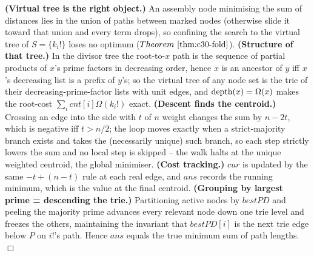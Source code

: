\begin{proofbox}
\textbf{(Virtual tree is the right object.)} An assembly node minimising the sum of distances lies
in the union of paths between marked nodes (otherwise slide it toward that union and every term
drops), so confining the search to the virtual tree of \(S=\{k_i!\}\) loses no optimum
(\(\thmref{c30-fold}\)). \textbf{(Structure of that tree.)} In the divisor tree the root-to-\(x\)
path is the sequence of partial products of \(x\)'s prime factors in decreasing order, hence
\(x\) is an ancestor of \(y\) iff \(x\)'s decreasing list is a prefix of \(y\)'s; so the virtual
tree of any node set is the trie of their decreasing-prime-factor lists with unit edges, and
\(\operatorname{depth}(x)=\Omega(x)\) makes the root-cost \(\sum_i\mathit{cnt}[i]\Omega(k_i!)\) exact.
\textbf{(Descent finds the centroid.)} Crossing an edge into the side with \(t\) of \(n\) weight
changes the sum by \(n-2t\), which is negative iff \(t>n/2\); the loop moves exactly when a
strict-majority branch exists and takes the (necessarily unique) such branch, so each step
strictly lowers the sum and no local step is skipped -- the walk halts at the unique weighted
centroid, the global minimiser. \textbf{(Cost tracking.)} \(\mathit{cur}\) is updated by the same
\(-t+(n-t)\) rule at each real edge, and \(\mathit{ans}\) records the running minimum, which is
the value at the final centroid. \textbf{(Grouping by largest prime = descending the trie.)}
Partitioning active nodes by \(\mathit{bestPD}\) and peeling the majority prime advances every
relevant node down one trie level and freezes the others, maintaining the invariant that
\(\mathit{bestPD}[i]\) is the next trie edge below \(P\) on \(i!\)'s path. Hence \(\mathit{ans}\)
equals the true minimum sum of path lengths. \(\Box\)
\end{proofbox}


